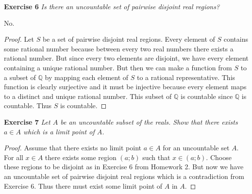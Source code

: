 \documentclass{article}
\begin{document}
\begin{flushleft}
\textbf{Exercise 6}
\textsl{Is there an uncountable set of pairwise disjoint real regions?}\newline

No.
\begin{proof}
Let $S$ be a set of pairwise disjoint real regions. Every element of $S$ contains some rational number because between every two real numbers there exists a rational number. But since every two elements are disjoint, we have every element containing a unique rational number. But then we can make a function from $S$ to a subset of $\mathbb{Q}$ by mapping each element of $S$ to a rational representative. This function is clearly surjective and it must be injective because every element maps to a distinct and unique rational number. This subset of $\mathbb{Q}$ is countable since $\mathbb{Q}$ is countable. Thus $S$ is countable.
\end{proof}

\textbf{Exercise 7}
\textsl{Let $A$ be an uncountable subset of the reals. Show that there exists $a \in A$ which is a limit point of $A$.}
\begin{proof}
Assume that there exists no limit point $a \in A$ for an uncountable set $A$. For all $x \in A$ there exists some region $(a;b)$ such that $x \in (a;b)$. Choose these regions to be disjoint as in Exercise 6 from Homework 2. But now we have an uncountable set of pairwise disjoint real regions which is a contradiction from Exercise 6. Thus there must exist some limit point of $A$ in $A$.
\end{proof}

\end{flushleft}
\end{document}

